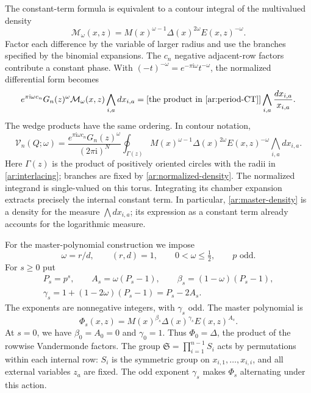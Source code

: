 \documentclass[11pt]{amsart}
\theoremstyle{definition}
\theoremstyle{remark}
\numberwithin{equation}{section}
\begin{document}
The constant-term formula is equivalent to a contour integral
of the multivalued density
\begin{equation}\label{ar:master-density}
 \mathcal M_\omega(x,z)=
 M(x)^{\omega-1}\Delta(x)^{2\omega}E(x,z)^{-\omega}.
\end{equation}
Factor each difference by the variable of larger radius and use
the branches specified by the binomial expansions. The $c_n$
negative adjacent-row factors contribute a constant phase.
With $(-t)^{-\omega}=e^{-\pi\mathrm i\omega}t^{-\omega}$, the
normalized differential form becomes
\begin{equation}\label{ar:normalized-density}
 e^{\pi\mathrm i\omega c_n}G_n(z)^\omega
 \mathcal M_\omega(x,z)\bigwedge_{i,a}dx_{i,a}
 =\left[\text{the product in \eqref{ar:period-CT}}\right]
   \bigwedge_{i,a}\frac{dx_{i,a}}{x_{i,a}}.
\end{equation}
The wedge products have the same ordering. In contour notation,
\begin{equation}\label{ar:period-contour}
 \mathcal V_n(Q;\omega)
 =\frac{e^{\pi\mathrm i\omega c_n}G_n(z)^\omega}
        {(2\pi\mathrm i)^N}
   \oint_{\Gamma(z)}
   M(x)^{\omega-1}\Delta(x)^{2\omega}E(x,z)^{-\omega}
   \bigwedge_{i,a}dx_{i,a}.
\end{equation}
Here $\Gamma(z)$ is the product of positively oriented circles
with the radii in \eqref{ar:interlacing}; branches are fixed by
\eqref{ar:normalized-density}. The normalized integrand is
single-valued on this torus. Integrating its chamber expansion
extracts precisely the internal constant term.
In particular, \eqref{ar:master-density} is a density for the
measure $\bigwedge dx_{i,a}$; its expression as a constant term
already accounts for the logarithmic measure.

For the master-polynomial construction we impose
\begin{equation}\label{ar:prime-assumptions}
 \omega=r/d,\qquad (r,d)=1,\qquad 0<\omega\leq\tfrac12,
 \qquad p\text{ odd}.
\end{equation}
For $s\geq0$ put
\begin{equation}\label{ar:exponents}
\begin{gathered}
 P_s=p^s,\qquad A_s=\omega(P_s-1),\qquad
 \beta_s=(1-\omega)(P_s-1),\\
 \gamma_s=1+(1-2\omega)(P_s-1)=P_s-2A_s.
\end{gathered}
\end{equation}
The exponents are nonnegative integers, with $\gamma_s$ odd.
The master polynomial is
\begin{equation}\label{ar:Phi}
 \Phi_s(x,z)=M(x)^{\beta_s}\Delta(x)^{\gamma_s}E(x,z)^{A_s}.
\end{equation}
At $s=0$, we have $\beta_0=A_0=0$ and $\gamma_0=1$.
Thus $\Phi_0=\Delta$, the product of the rowwise Vandermonde
factors. The group $\mathfrak S=\prod_{i=1}^{n-1}S_i$ acts by
permutations within each internal row: $S_i$ is the symmetric group
on $x_{i,1},\ldots,x_{i,i}$, and all external variables $z_a$ are
fixed. The odd exponent $\gamma_s$ makes $\Phi_s$ alternating
under this action.
\end{document}
